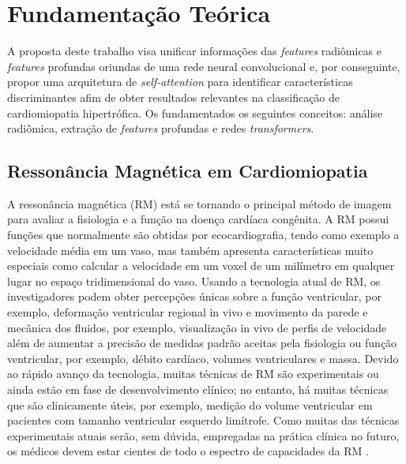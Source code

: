 \chapter{Fundamentação Teórica}
\label{chap:fundamentacao_teorica}

A proposta deste trabalho visa unificar informações das \textit{features} radiômicas e \textit{features} profundas oriundas de uma rede neural convolucional e, por conseguinte, propor uma arquitetura de \textit{self-attention} para identificar características discriminantes afim de obter resultados relevantes na classificação de cardiomiopatia hipertrófica. Os fundamentados os seguintes conceitos: análise radiômica, extração de \textit{features} profundas e redes \textit{transformers}.

\section{Ressonância Magnética em Cardiomiopatia}

A ressonância magnética (RM) está se tornando o principal método de imagem para avaliar a fisiologia e a função na doença cardíaca congênita. A RM possui funções que normalmente são obtidas por ecocardiografia, tendo como exemplo a velocidade média em um vaso, mas também apresenta características muito especiais como calcular a velocidade em um voxel de um milímetro em qualquer lugar no espaço tridimensional do vaso.
Usando a tecnologia atual de RM, os investigadores podem obter percepções únicas sobre a função ventricular, por exemplo, deformação ventricular regional in vivo e movimento da parede e mecânica dos fluidos, por exemplo, visualização in vivo de perfis de velocidade além de aumentar a precisão de medidas padrão aceitas pela fisiologia ou função ventricular, por exemplo, débito cardíaco, volumes ventriculares e massa. Devido ao rápido avanço da tecnologia, muitas técnicas de RM são experimentais ou ainda estão em fase de desenvolvimento clínico; no entanto, há muitas técnicas que são clinicamente úteis, por exemplo, medição do volume ventricular em pacientes com tamanho ventricular esquerdo limítrofe. Como muitas das técnicas experimentais atuais serão, sem dúvida, empregadas na prática clínica no futuro, os médicos devem estar cientes de todo o espectro de capacidades da RM \cite{fogelAssessmentCardiacFunction2000}.

